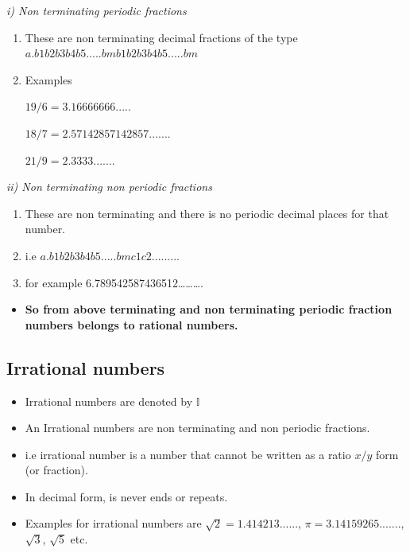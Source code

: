 \documentclass[]{book}
\providecommand{\tightlist}{%
  \setlength{\itemsep}{0pt}\setlength{\parskip}{0pt}}
\begin{document}
\emph{i) Non terminating periodic fractions}

\begin{enumerate}
\def\labelenumi{\alph{enumi}.}
\item
  These are non terminating decimal fractions of the type \(a.b1b2b3b4b5 .....bmb1b2b3b4b5 .....bm\)
\item
  Examples

  \(19/6 = 3.16666666.....\)

  \(18/7 = 2.57142857142857.......\)

  \(21/9= 2.3333.......\)
\end{enumerate}

\emph{ii) Non terminating non periodic fractions}

\begin{enumerate}
\def\labelenumi{\alph{enumi}.}
\tightlist
\item
  These are non terminating and there is no periodic decimal places for that number.
\item
  i.e \(a.b1b2b3b4b5 .....bmc1c2.........\)
\item
  for example 6.789542587436512\ldots{}\ldots{}\ldots{}.
\end{enumerate}

\begin{itemize}
\tightlist
\item
  \textbf{So from above terminating and non terminating periodic fraction numbers belongs to rational numbers.}
\end{itemize}

\hypertarget{irrational-numbers}{%
\subsection{Irrational numbers}\label{irrational-numbers}}

\begin{itemize}
\tightlist
\item
  Irrational numbers are denoted by \(\mathbb{I}\)
\item
  An Irrational numbers are non terminating and non periodic fractions.
\item
  i.e irrational number is a number that cannot be written as a ratio \(x/y\) form (or fraction).
\item
  In decimal form, is never ends or repeats.
\item
  Examples for irrational numbers are \(\sqrt{2} = 1.414213......\), \(\pi = 3.14159265.......\), \(\sqrt{3}\), \(\sqrt{5}\) etc.
\end{itemize}
\end{document}
